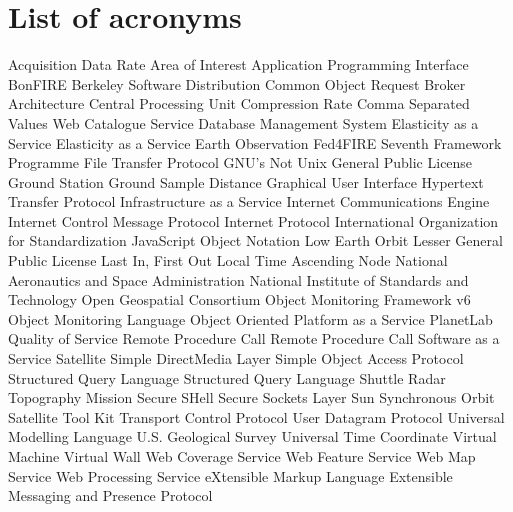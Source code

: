 \chapter{List of acronyms}

{\small
\begin{acronym}[XXXXXXXX]
    {Acquisition Data Rate}
    {Area of Interest}
  {Application Programming Interface}
      {BonFIRE}
 {Berkeley Software Distribution}
   {Common Object Request Broker Architecture}
     {Central Processing Unit}
      {Compression Rate}
     {Comma Separated Values}
       {Web Catalogue Service}
    {Database Management System}
    {Elasticity as a Service}
   {Elasticity as a Service}
   {Earth Observation}
       {Fed4FIRE}
   {Seventh Framework Programme}
     {File Transfer Protocol}
       {\acs{GNU}'s Not Unix}
   {General Public License}
      {Ground Station}
   {Ground Sample Distance}
   {Graphical User Interface}
    {Hypertext Transfer Protocol}
   {Infrastructure as a Service}
   {Internet Communications Engine}
   {Internet Control Message Protocol}
   {Internet Protocol}
   {International Organization for Standardization}
   {JavaScript Object Notation}
   {Low Earth Orbit}
   {Lesser General Public License}
    {Last In, First Out}
   {Local Time Ascending Node}
   {National Aeronautics and Space Administration}
   {National Institute of Standards and Technology}
   {Open Geospatial Consortium}
   {Object Monitoring Framework v6}
   {Object Monitoring Language}
        {Object Oriented}
   {Platform as a Service}
      {PlanetLab}
   {Quality of Service}
       {Remote Procedure Call}
   {Remote Procedure Call}
   {Software as a Service}
     {Satellite}
   {Simple DirectMedia Layer}
   {Simple Object Access Protocol}
     {Structured Query Language}
   {Structured Query Language}
   {Shuttle Radar Topography Mission}
   {Secure SHell}
   {Secure Sockets Layer}
   {Sun Synchronous Orbit}
     {Satellite Tool Kit}
   {Transport Control Protocol}
   {User Datagram Protocol}
     {Universal Modelling Language}
   {U.S. Geological Survey}
     {Universal Time Coordinate}
      {Virtual Machine}
      {Virtual Wall}
   {Web Coverage Service}
   {Web Feature Service}
   {Web Map Service}
   {Web Processing Service}
      {eXtensible Markup Language}
   {Extensible Messaging and Presence Protocol}
\end{acronym}
}


